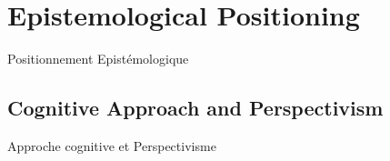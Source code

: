 




\newpage



\section{Epistemological Positioning}{Positionnement Epistémologique}\label{sec:epistemology}




\subsection{Cognitive Approach and Perspectivism}{Approche cognitive et Perspectivisme}



